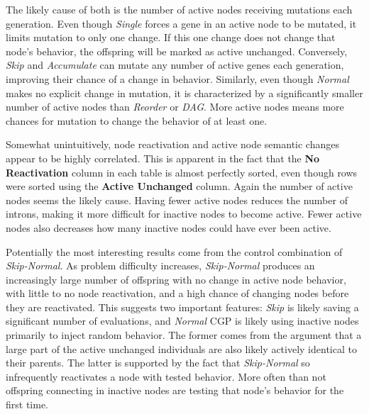 \documentclass[journal]{IEEEtran}
\begin{document}
The likely cause of both is the number
of active nodes receiving mutations each generation.  Even though \emph{Single}
forces a gene in an active node to be mutated, it limits mutation to only one change.
If this one change does not change that node's behavior, the offspring will be marked
as active unchanged.  Conversely, \emph{Skip} and \emph{Accumulate} can mutate any
number of active genes each generation, improving their chance of a change in behavior.
Similarly, even though \emph{Normal} makes no explicit change in mutation, it is characterized
by a significantly smaller number of active nodes than \emph{Reorder} or \emph{DAG}.  More
active nodes means more chances for mutation to change the behavior of at least one.

Somewhat unintuitively, node reactivation and active node semantic changes appear
to be highly correlated.  This is apparent in the fact that the \textbf{No Reactivation}
column in each table is almost perfectly sorted, even though rows were sorted using the
\textbf{Active Unchanged} column.  Again the number of active nodes seems the likely
cause.  Having fewer active nodes reduces the number of introns, making it more
difficult for inactive nodes to become active.  Fewer active nodes also decreases
how many inactive nodes could have ever been active.

Potentially the most interesting results come from the control combination of
\emph{Skip-Normal}.  As problem difficulty increases, \emph{Skip-Normal} produces
an increasingly large number of offspring with no change in active node behavior,
with little to no node reactivation, and a high chance of changing nodes before
they are reactivated.  This suggests two important features: \emph{Skip} is likely
saving a significant number of evaluations, and \emph{Normal} CGP is likely using
inactive nodes primarily to inject random behavior.  The former comes from the
argument that a large part of the active unchanged individuals are also likely
actively identical to their parents.  The latter is supported by the fact that
\emph{Skip-Normal} so infrequently reactivates a node with tested behavior.  More
often than not offspring connecting in inactive nodes are testing that node's behavior
for the first time.
\end{document}
